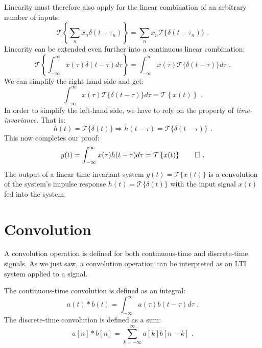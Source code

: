 Linearity must therefore also apply for the linear combination of an arbitrary number of inputs:
\begin{equation}
  \mathcal{T}\left\{\sum_n x_n \delta(t-\tau_n)\right\} = \sum_n x_n \mathcal{T}\{\delta(t-\tau_n)\}\,\,.
\end{equation}
Linearity can be extended even further into a continuous linear combination:
\begin{equation}
  \mathcal{T}\left\{\int_{-\infty}^{\infty} x(\tau)\delta(t-\tau)d\tau\right\} = \int_{-\infty}^{\infty} x(\tau) \mathcal{T}\{\delta(t-\tau)\} d\tau\,\,.
\end{equation}
We can simplify the right-hand side and get:
\begin{equation}
  \int_{-\infty}^{\infty} x(\tau) \mathcal{T}\{\delta(t-\tau)\} d\tau = \mathcal{T}\left\{x(t)\right\}\,\,.
\end{equation}
In order to simplify the left-hand side, we have to rely on the property of \emph{time-invariance}. That is:
\begin{equation}
  h(t) = \mathcal{T}\{\delta(t)\} \Rightarrow h(t-\tau) = \mathcal{T}\{\delta(t-\tau)\}\,\,.
\end{equation}
This now completes our proof:
\begin{equation}
  y(t)=\int_{-\infty}^{\infty} x(\tau) h(t-\tau) d\tau = \mathcal{T}\left\{x(t)\right\}\qed\,\,.
\end{equation}
The output of a linear time-invariant system $y(t)=\mathcal{T}\{x(t)\}$ is a convolution of the system's
impulse response $h(t)=\mathcal{T}\{\delta(t)\}$ with the input signal $x(t)$ fed into the system.

\section{Convolution}

A convolution operation is defined for both continuous-time and
discrete-time signals. As we just saw, a convolution operation can be
interpreted as an LTI system applied to a signal.

The continuous-time convolution is defined as an integral:
\begin{equation}
  \boxed{
    a(t)*b(t) = \int_{-\infty}^{\infty}a(\tau)b(t-\tau)d\tau\,\,.
  }
\end{equation}
The discrete-time convolution is defined as a sum:
\begin{equation}
  \boxed{
  a[n]*b[n] = \sum_{k=-\infty}^{\infty}a[k]b[n-k]\,\,.
  }
\end{equation}

